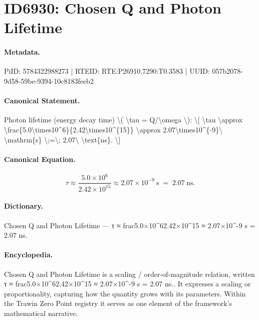 \section*{ID6930: Chosen Q and Photon Lifetime}
\paragraph{Metadata.}
PiID: 5784322988273 | RTEID: RTE:P26910.7290:T0.3583 | UUID: 057b2078-9d58-59be-9394-10c8183feeb2

\paragraph{Canonical Statement.}
Photon lifetime (energy decay time) \textbackslash{}( \textbackslash{}tau = Q/\textbackslash{}omega \textbackslash{}): \textbackslash{}[ \textbackslash{}tau \textbackslash{}approx \textbackslash{}frac\{5.0\textbackslash{}times10\textasciicircum{}6\}\{2.42\textbackslash{}times10\textasciicircum{}\{15\}\} \textbackslash{}approx 2.07\textbackslash{}times10\textasciicircum{}\{-9\}\textbackslash{} \textbackslash{}mathrm\{s\} \textbackslash{};=\textbackslash{}; 2.07\textbackslash{} \textbackslash{}text\{ns\}. \textbackslash{}]

\paragraph{Canonical Equation.}
\[
\tau \approx \frac{5.0\times10^6}{2.42\times10^{15}} \approx 2.07\times10^{-9}\ \mathrm{s} \;=\; 2.07\ \text{ns}.
\]

\paragraph{Dictionary.}
Chosen Q and Photon Lifetime — τ ≈ frac5.0×10\textasciicircum{}62.42×10\textasciicircum{}15 ≈ 2.07×10\textasciicircum{}-9 s = 2.07 ns.

\paragraph{Encyclopedia.}
Chosen Q and Photon Lifetime is a scaling / order-of-magnitude relation, written τ ≈ frac5.0×10\textasciicircum{}62.42×10\textasciicircum{}15 ≈ 2.07×10\textasciicircum{}-9 s = 2.07 ns.. It expresses a scaling or proportionality, capturing how the quantity grows with its parameters. Within the Trawin Zero Point registry it serves as one element of the framework's mathematical narrative.
